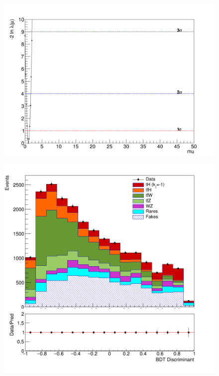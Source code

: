 \begin{linenumbers}
\begin{figure}[!htbp]
\begin{minipage}[b]{0.48\textwidth}
		\includegraphics[width=\textwidth]{Chapter4/kt-1/300fb/Likelihood.png}
	\end{minipage}
	\begin{minipage}[b]{0.48\textwidth}
		\includegraphics[width=\textwidth]{Chapter4/kt-1/3000fb/simple-3000-kt-1.png}
	\end{minipage}
	\hfill
	\begin{minipage}[b]{0.48\textwidth}

\end{minipage}
\end{figure}
\end{linenumbers}
